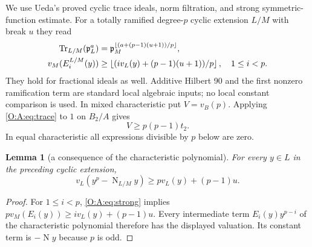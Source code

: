 \documentclass[11pt]{amsart}
\newtheorem{lemma}[theorem]{Lemma}
\theoremstyle{definition}
\theoremstyle{remark}
\newcommand{\Tr}{\operatorname{Tr}}
\newcommand{\Nm}{\operatorname{N}}
\newcommand{\floor}[1]{\left\lfloor #1\right\rfloor}
\begin{document}
We use Ueda's proved cyclic trace ideals, norm filtration, and strong
symmetric-function estimate.  For a totally ramified degree-$p$ cyclic
extension $L/M$ with break $u$ they read
\begin{align}
 \Tr_{L/M}(\pp_L^a)&=\pp_M^{\floor{(a+(p-1)(u+1))/p}},\label{O:A:eq:trace}\\
 v_M(E_i^{L/M}(y))&\ge\floor{(i v_L(y)+(p-1)(u+1))/p},\quad 1\le i<p.
 \label{O:A:eq:strong}
\end{align}
They hold for fractional ideals as well.  Additive Hilbert 90 and the first
nonzero ramification term are standard local algebraic inputs; no local
constant comparison is used.
In mixed characteristic put $V=v_B(p)$.  Applying \eqref{O:A:eq:trace} to $1$
on $B_2/A$ gives
\begin{equation}
 V\ge p(p-1)t_2.\label{O:A:eq:pbound}
\end{equation}
In equal characteristic all expressions divisible by $p$ below are zero.

\begin{lemma}[a consequence of the characteristic polynomial]\label{O:A:lem:power}
For every $y\in L$ in the preceding cyclic extension,
\[
 v_L(y^p-\Nm_{L/M}y)\ge p v_L(y)+(p-1)u.
\]
\end{lemma}
\begin{proof}
For $1\le i<p$, \eqref{O:A:eq:strong} implies
$pv_M(E_i(y))\ge i v_L(y)+(p-1)u$.
Every intermediate term $E_i(y)y^{p-i}$ of the characteristic polynomial
therefore has the displayed valuation.  Its constant term is $-\Nm y$
because $p$ is odd.
\end{proof}
\end{document}
